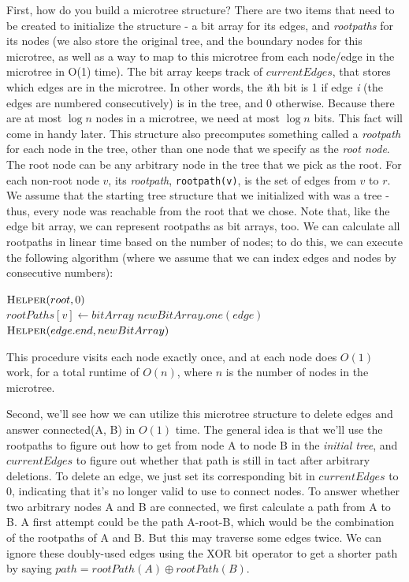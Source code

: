 \documentclass{article}
\begin{document}
First, how do you build a microtree structure?  There are two items that need to be created to initialize the structure - a bit array for its edges, and \textit{rootpaths} for its nodes (we also store the original tree, and the boundary nodes for this microtree, as well as a way to map to this microtree from each node/edge in the microtree in O(1) time). The bit array keeps track of $currentEdges$, that stores which edges are in the microtree.  In other words, the \textit{i}th bit is 1 if edge \textit{i} (the edges are numbered consecutively) is in the tree, and 0 otherwise.  Because there are at most $\log n$ nodes in a microtree, we need at most $\log n$ bits.  This fact will come in handy later. This structure also precomputes something called a \textit{rootpath} for each node in the tree, other than one node that we specify as the \textit{root node}.  The root node can be any arbitrary node in the tree that we pick as the root.  For each non-root node $v$, its \textit{rootpath}, \texttt{rootpath(v)}, is the set of edges from $v$ to $r$.  We assume that the starting tree structure that we initialized with was a tree - thus, every node was reachable from the root that we chose.  Note that, like the edge bit array, we can represent rootpaths as bit arrays, too.  We can calculate all rootpaths in linear time based on the number of nodes; to do this, we can execute the following algorithm (where we assume that we can index edges and nodes by consecutive numbers):\\

\begin{algorithmic}
            \State $\Call{Helper}{root, 0}$
    \EndProcedure\\
    		\State $rootPaths[v] \gets bitArray$
    		    \State $newBitArray.one(edge)$ 
    		    \State $\Call{Helper}{edge.end, newBitArray}$
    		\EndFor\label{edgesLoop}
    \EndProcedure
\end{algorithmic}

This procedure visits each node exactly once, and at each node does $O(1)$ work, for a total runtime of $O(n)$, where $n$ is the number of nodes in the microtree.

Second, we'll see how we can utilize this microtree structure to delete edges and answer connected(A, B) in $O(1)$ time.  The general idea is that we'll use the rootpaths to figure out how to get from node A to node B in the \textit{initial tree}, and $currentEdges$ to figure out whether that path is still in tact after arbitrary deletions.  To delete an edge, we just set its corresponding bit in $currentEdges$ to 0, indicating that it's no longer valid to use to connect nodes.  To answer whether two arbitrary nodes A and B are connected, we first calculate a path from A to B.  A first attempt could be the path A-root-B, which would be the combination of the rootpaths of A and B.  But this may traverse some edges twice.  We can ignore these doubly-used edges using the XOR bit operator to get a shorter path by saying $path = rootPath(A) \oplus rootPath(B)$.
\end{document}
